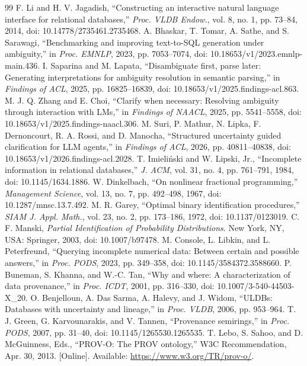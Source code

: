 \begin{thebibliography}{99}
 F. Li and H. V. Jagadish, ``Constructing an interactive natural language interface for relational databases,'' \emph{Proc. VLDB Endow.}, vol. 8, no. 1, pp. 73--84, 2014, doi: 10.14778/2735461.2735468.
 A. Bhaskar, T. Tomar, A. Sathe, and S. Sarawagi, ``Benchmarking and improving text-to-SQL generation under ambiguity,'' in \emph{Proc. EMNLP}, 2023, pp. 7053--7074, doi: 10.18653/v1/2023.emnlp-main.436.
 I. Saparina and M. Lapata, ``Disambiguate first, parse later: Generating interpretations for ambiguity resolution in semantic parsing,'' in \emph{Findings of ACL}, 2025, pp. 16825--16839, doi: 10.18653/v1/2025.findings-acl.863.
 M. J. Q. Zhang and E. Choi, ``Clarify when necessary: Resolving ambiguity through interaction with LMs,'' in \emph{Findings of NAACL}, 2025, pp. 5541--5558, doi: 10.18653/v1/2025.findings-naacl.306.
 M. Suri, P. Mathur, N. Lipka, F. Dernoncourt, R. A. Rossi, and D. Manocha, ``Structured uncertainty guided clarification for LLM agents,'' in \emph{Findings of ACL}, 2026, pp. 40811--40838, doi: 10.18653/v1/2026.findings-acl.2028.
 T. Imieli\'nski and W. Lipski, Jr., ``Incomplete information in relational databases,'' \emph{J. ACM}, vol. 31, no. 4, pp. 761--791, 1984, doi: 10.1145/1634.1886.
 W. Dinkelbach, ``On nonlinear fractional programming,'' \emph{Management Science}, vol. 13, no. 7, pp. 492--498, 1967, doi: 10.1287/mnsc.13.7.492.
 M. R. Garey, ``Optimal binary identification procedures,'' \emph{SIAM J. Appl. Math.}, vol. 23, no. 2, pp. 173--186, 1972, doi: 10.1137/0123019.
 C. F. Manski, \emph{Partial Identification of Probability Distributions}. New York, NY, USA: Springer, 2003, doi: 10.1007/b97478.
 M. Console, L. Libkin, and L. Peterfreund, ``Querying incomplete numerical data: Between certain and possible answers,'' in \emph{Proc. PODS}, 2023, pp. 349--358, doi: 10.1145/3584372.3588660.
 P. Buneman, S. Khanna, and W.-C. Tan, ``Why and where: A characterization of data provenance,'' in \emph{Proc. ICDT}, 2001, pp. 316--330, doi: 10.1007/3-540-44503-X\_20.
 O. Benjelloun, A. Das Sarma, A. Halevy, and J. Widom, ``ULDBs: Databases with uncertainty and lineage,'' in \emph{Proc. VLDB}, 2006, pp. 953--964.
 T. J. Green, G. Karvounarakis, and V. Tannen, ``Provenance semirings,'' in \emph{Proc. PODS}, 2007, pp. 31--40, doi: 10.1145/1265530.1265535.
 T. Lebo, S. Sahoo, and D. McGuinness, Eds., ``PROV-O: The PROV ontology,'' W3C Recommendation, Apr. 30, 2013. [Online]. Available: \url{https://www.w3.org/TR/prov-o/}.

\end{thebibliography}
